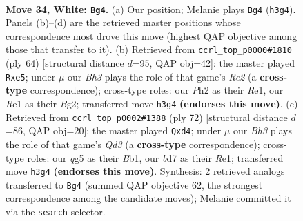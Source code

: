 \documentclass[11pt]{article}
\begin{document}
\clearpage

\begin{figure}[p]\centering
\begin{subfigure}{0.46\textwidth}\centering
\resizebox{\linewidth}{!}{%
\newchessgame
\chessboard[
  setfen={r2r3k/bp1b1Qp1/p3p2P/6q1/8/BP1p3B/P4PKP/1R2R3 w - - 1 34},
  showmover=false,
  pgfstyle=straightmove, color=movearrow, markmove={h3-g4}
]}
\caption{}
\end{subfigure}\hfill
\begin{subfigure}{0.46\textwidth}\centering
\resizebox{\linewidth}{!}{%
\newchessgame
\chessboard[
  setfen={2r2r1k/4n2p/1p1q4/p2Pp1QP/8/6P1/2b1RPB1/4R1K1 w - - 1 33},
  showmover=false,
  pgfstyle=straightmove, color=movearrow, markmove={e2-e5}
]}
\caption{}
\end{subfigure}
\\[4pt]
\begin{subfigure}{0.46\textwidth}\centering
\resizebox{\linewidth}{!}{%
\newchessgame
\chessboard[
  setfen={b2rr1k1/5p2/6pp/pp1PP3/3b4/qp1Q2BP/6P1/1BR1R2K w - - 0 37},
  showmover=false,
  pgfstyle=straightmove, color=movearrow, markmove={d3-d4}
]}
\caption{}
\end{subfigure}\hfill

\caption{\textbf{Move 34, White: \texttt{Bg4}.} (a) Our position; Melanie plays \texttt{Bg4} (\texttt{h3g4}). Panels (b)--(d) are the retrieved master positions whose correspondence most drove this move (highest QAP objective among those that transfer to it). (b) Retrieved from \texttt{ccrl\_top\_p0000\#1810} (ply 64) [structural distance $d$=95, QAP obj=42]: the master played \texttt{Rxe5}; under $\mu$ our \emph{Bh3} plays the role of that game's \emph{Re2} (a \textbf{cross-type} correspondence); cross-type roles: our \emph{P}h2 as their \emph{R}e1, our \emph{R}e1 as their \emph{B}g2; transferred move \texttt{h3g4} \textbf{(endorses this move)}. (c) Retrieved from \texttt{ccrl\_top\_p0002\#1388} (ply 72) [structural distance $d$=86, QAP obj=20]: the master played \texttt{Qxd4}; under $\mu$ our \emph{Bh3} plays the role of that game's \emph{Qd3} (a \textbf{cross-type} correspondence); cross-type roles: our \emph{q}g5 as their \emph{B}b1, our \emph{b}d7 as their \emph{R}e1; transferred move \texttt{h3g4} \textbf{(endorses this move)}. Synthesis: 2 retrieved analogs transferred to \texttt{Bg4} (summed QAP objective 62, the strongest correspondence among the candidate moves); Melanie committed it via the \texttt{search} selector.}
\label{fig:thought-m66}
\end{figure}
\end{document}
